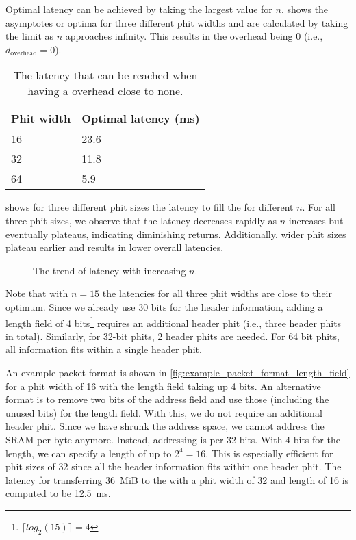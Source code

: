 Optimal latency can be achieved by taking the largest value for $n$.
 shows the asymptotes or optima for three different phit widths and are calculated by taking the limit as $n$ approaches infinity.
This results in the overhead being $0$ (i.e., $d_{\text{overhead}} = 0$).

\begin{table}[hbtp]
\centering
\begin{tabular}{@{}ll@{}}
\toprule
\textbf{Phit width} & \textbf{Optimal latency (ms)} \\ \midrule
16        & 23.6                  \\
32        & 11.8                  \\
64        & 5.9                   \\ \bottomrule
\end{tabular}
\caption{The latency that can be reached when having a overhead close to none.}
\label{tab:length_field_optimal_latency}
\end{table}

 shows for three different phit sizes the latency to fill the \graicore{} for different $n$.
For all three phit sizes, we observe that the latency decreases rapidly as $n$ increases but eventually plateaus, indicating diminishing returns.
Additionally, wider phit sizes plateau earlier and results in lower overall latencies.

\begin{figure}[hbtp]
    \centering
    
    \caption{The trend of latency with increasing $n$.}
    \label{fig:n_vs_latency}
\end{figure}

Note that with $n=15$ the latencies for all three phit widths are close to their optimum.
Since we already use 30 bits for the header information, adding a length field of 4 bits\footnote{$\lceil log_{2}( 15 )\rceil = 4$} requires an additional header phit (i.e., three header phits in total). Similarly, for 32-bit phits, 2 header phits are needed. For 64 bit phits, all information fits within a single header phit.

An example packet format is shown in \cref{fig:example_packet_format_length_field} for a phit width of 16 with the length field taking up 4 bits.
An alternative format is to remove two bits of the address field and use those (including the unused bits) for the length field.
With this, we do not require an additional header phit.
Since we have shrunk the address space, we cannot address the SRAM per byte anymore.
Instead, addressing is per 32 bits.
With 4 bits for the length, we can specify a length of up to $2^4 = 16$.
This is especially efficient for phit sizes of 32 since all the header information fits within one header phit.
The latency for transferring \SI{36}{MiB} to the \graicore{} with a phit width of 32 and length of 16 is computed to be \SI{12.5}{ms}.

